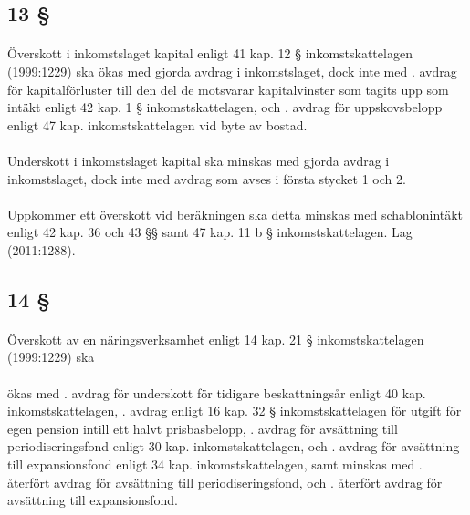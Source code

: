 \documentclass[a4paper,notitlepage,openany,10pt]{book}
\begin{document}
\subsection*{13 §}
\paragraph*{}
Överskott i inkomstslaget kapital enligt 41 kap. 12 § inkomstskattelagen (1999:1229) ska ökas med gjorda avdrag i inkomstslaget, dock inte med
. avdrag för kapitalförluster till den del de motsvarar kapitalvinster som tagits upp som intäkt enligt 42 kap. 1 § inkomstskattelagen, och
. avdrag för uppskovsbelopp enligt 47 kap. inkomstskattelagen vid byte av bostad.
\paragraph*{}
Underskott i inkomstslaget kapital ska minskas med gjorda avdrag i inkomstslaget, dock inte med avdrag som avses i första stycket 1 och 2.
\paragraph*{}
Uppkommer ett överskott vid beräkningen ska detta minskas med schablonintäkt enligt 42 kap. 36 och 43 §§ samt 47 kap. 11 b § inkomstskattelagen.
Lag (2011:1288).
\subsection*{14 §}
\paragraph*{}
Överskott av en näringsverksamhet enligt 14 kap. 21 § inkomstskattelagen (1999:1229) ska
\paragraph*{}
ökas med
. avdrag för underskott för tidigare beskattningsår enligt 40 kap. inkomstskattelagen,
. avdrag enligt 16 kap. 32 § inkomstskattelagen för utgift för egen pension intill ett halvt prisbasbelopp,
. avdrag för avsättning till periodiseringsfond enligt 30 kap. inkomstskattelagen, och
. avdrag för avsättning till expansionsfond enligt 34 kap.
inkomstskattelagen,
samt minskas med
. återfört avdrag för avsättning till periodiseringsfond, och
. återfört avdrag för avsättning till expansionsfond.
\end{document}
